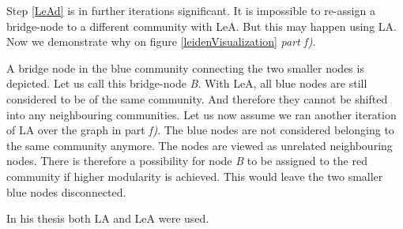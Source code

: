 Step \ref{LeAd} is in further iterations significant.  It is impossible to re-assign a bridge-node to a different community with LeA. But this may happen using LA. Now we demonstrate why on figure \ref{leidenVisualization} \textit{part f)}. 

A bridge node in the blue community connecting the two smaller nodes is depicted. Let us call this bridge-node \textit{B}. With LeA, all blue nodes are still considered to be of the same community. And therefore they cannot be shifted into any neighbouring communities. Let us now assume we ran another iteration of LA over the graph in part \textit{f)}. The blue nodes are not considered belonging to the same community anymore. The nodes are viewed as unrelated neighbouring nodes. There is therefore a possibility for node \textit{B} to be assigned to the red community if higher modularity is achieved. This would leave the two smaller blue nodes disconnected. 

In his thesis both LA and LeA were used.